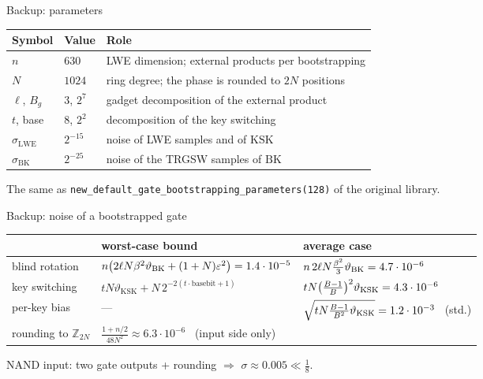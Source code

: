 \documentclass[aspectratio=169,11pt]{beamer}
\newcommand{\Z}{\mathbb{Z}}
\newcommand{\Bg}{B_g}
\newcommand{\BK}{\mathrm{BK}}
\newcommand{\KSK}{\mathrm{KSK}}
\begin{document}
\appendix

\begin{frame}{Backup: parameters}
\centering
\begin{tabular}{@{}lll@{}}
\toprule
Symbol & Value & Role\\
\midrule
$n$ & $630$ & LWE dimension; external products per bootstrapping\\
$N$ & $1024$ & ring degree; the phase is rounded to $2N$ positions\\
$\ell$, $\Bg$ & $3$, $2^7$ & gadget decomposition of the external product\\
$t$, base & $8$, $2^2$ & decomposition of the key switching\\
$\sigma_{\mathrm{LWE}}$ & $2^{-15}$ & noise of LWE samples and of $\KSK$\\
$\sigma_{\BK}$ & $2^{-25}$ & noise of the TRGSW samples of $\BK$\\
\bottomrule
\end{tabular}

\vspace{10pt}
\small The same as \texttt{new\_default\_gate\_bootstrapping\_parameters(128)} of the original library.
\end{frame}

\begin{frame}{Backup: noise of a bootstrapped gate}
\centering
\small
\renewcommand{\arraystretch}{1.6}
\begin{tabular}{@{}lll@{}}
\toprule
 & worst-case bound & average case\\
\midrule
blind rotation & $n\big(2\ell N\beta^2\vartheta_{\BK}+(1+N)\varepsilon^2\big)=\BoundBR$
  & $n\,2\ell N\frac{\beta^2}{3}\vartheta_{\BK}=\AvgBR$\\
key switching & $tN\vartheta_{\KSK}+N\,2^{-2(t\cdot\mathrm{basebit}+1)}$
  & $tN\big(\frac{B-1}{B}\big)^2\vartheta_{\KSK}=\AvgKS$\\
per-key bias & --- & $\sqrt{tN\frac{B-1}{B^2}\vartheta_{\KSK}}=\BiasStd$ \ (std.)\\
rounding to $\Z_{2N}$ & \multicolumn{2}{l}{$\frac{1+n/2}{48N^2}\approx6.3\cdot10^{-6}$ \ (input side only)}\\
\bottomrule
\end{tabular}

\vspace{10pt}
NAND input: two gate outputs + rounding $\Rightarrow$ $\sigma\approx0.005\ll\frac18$.
\end{frame}
\end{document}
